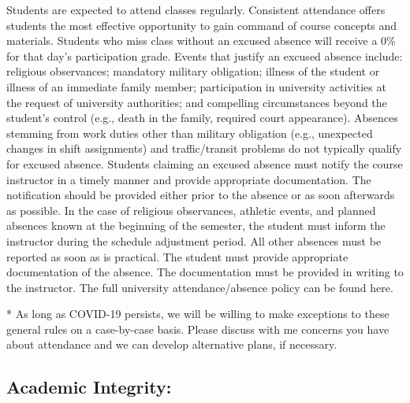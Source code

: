 \documentclass[
]{book}
\begin{document}
Students are expected to attend classes regularly. Consistent attendance offers students the most effective opportunity to gain command of course concepts and materials. Students who miss class without an excused absence will receive a 0\% for that day's participation grade. Events that justify an excused absence include: religious observances; mandatory military obligation; illness of the student or illness of an immediate family member; participation in university activities at the request of university authorities; and compelling circumstances beyond the student's control (e.g., death in the family, required court appearance). Absences stemming from work duties other than military obligation (e.g., unexpected changes in shift assignments) and traffic/transit problems do not typically qualify for excused absence. Students claiming an excused absence must notify the course instructor in a timely manner and provide appropriate documentation. The notification should be provided either prior to the absence or as soon afterwards as possible. In the case of religious observances, athletic events, and planned absences known at the beginning of the semester, the student must inform the instructor during the schedule adjustment period. All other absences must be reported as soon as is practical. The student must provide appropriate documentation of the absence. The documentation must be provided in writing to the instructor. The full university attendance/absence policy can be found here.

* As long as COVID-19 persists, we will be willing to make exceptions to these general rules on a case-by-case basis. Please discuss with me concerns you have about attendance and we can develop alternative plans, if necessary.

\hypertarget{academic-integrity}{%
\subsection{Academic Integrity:}\label{academic-integrity}}
\end{document}
